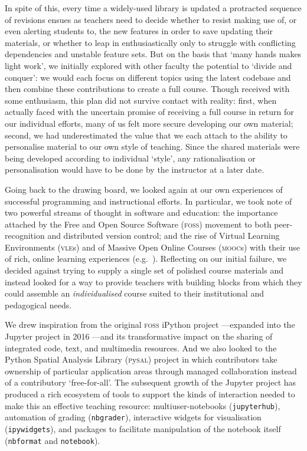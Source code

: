 \documentclass[letter, 11pt,titlepage]{article}
\newcommand{\eg}{e.g.~\/}
\newcommand{\comment}[1]{\todo[inline, color=green!40]{#1}}
\begin{document}
In spite of this, every time a widely-used library is updated a protracted sequence of revisions ensues as teachers need to decide whether to resist making use of, or even alerting students to, the new features in order to save updating their materials, or whether to leap in enthusiastically only to struggle with conflicting dependencies and unstable feature sets. But on the basis that `many hands makes light work', we initially explored with other faculty the potential to `divide and conquer': we would each focus on different topics using the latest codebase and then combine these contributions to create a full course. Though received with some enthusiasm, this plan did not survive contact with reality: first, when actually faced with the uncertain promise of receiving a full course in return for our individual efforts, many of us felt more secure developing our own material; second, we had underestimated the value that we each attach to the ability to personalise material to our own style of teaching. Since the shared materials were being developed according to individual `style', any rationalisation or personalisation would have to be done by the instructor at a later date.

\comment{Work in OER material below}

Going back to the drawing board, we looked again at our own experiences of successful programming and instructional efforts. In particular, we took note of two powerful streams of thought in software and education: the importance attached by the Free and Open Source Software (\textsc{foss}) movement to both peer-recognition \citep{raymond_cathedral_1999} and distributed version control; and the rise of Virtual Learning Environments (\textsc{vle}s) and of Massive Open Online Courses (\textsc{mooc}s) with their use of rich, online learning experiences (\eg \citealp{Trafford2011,Cabiria2012}). Reflecting on our initial failure, we decided against trying to supply a single set of polished course materials and instead looked for a way to provide teachers with building blocks from which they could assemble an \emph{individualised} course suited to their institutional and pedagogical needs.

We drew inspiration from the original \textsc{foss} iPython project \citep{perez_2007_ipython}---expanded into the Jupyter project in 2016 \citep{kluyver16}---and its transformative impact on the sharing of integrated code, text, and multimedia resources. And we also looked to the Python Spatial Analysis Library (\textsc{p}y\textsc{sal}) project \citep{rey_19sea} in which contributors take ownership of particular application areas through managed collaboration instead of a contributory `free-for-all'. The subsequent growth of the Jupyter project has produced a rich ecosystem of tools to support the kinds of interaction needed to make this an effective teaching resource: multiuser-notebooks (\texttt{jupyterhub}), automation of grading (\texttt{nbgrader}), interactive widgets for visualisation (\texttt{ipywidgets}), and packages to facilitate manipulation of the notebook itself (\texttt{nbformat} and \texttt{notebook}).
\end{document}
